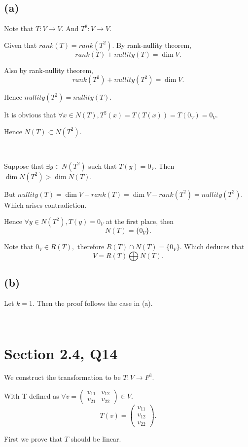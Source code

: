 \documentclass[12pt]{article}%
\begin{document}
\subsection{(a)}

Note that $T:V \to V.$ And $T^2:V \to V.$

Given that $rank(T)=rank(T^2).$ By rank-nullity theorem, $$rank(T)+nullity(T)=\dim{V}.$$

Also by rank-nullity theorem, $$rank(T^2)+nullity(T^2)=\dim{V}.$$

Hence $nullity(T^2)=nullity(T).$

It is obvious that $\forall x\in N(T),T^2(x)=T(T(x))=T(0_V)=0_V.$

Hence $N(T) \subset N(T^2).$

~\ 

Suppose that $\exists y \in N(T^2)$ such that $T(y)=0_V.$ Then $\dim{N(T^2)}>\dim{N(T)}.$

But $nullity(T)=\dim{V}-rank(T)=\dim{V}-rank(T^2)=nullity(T^2).$ Which arises contradiction.

Hence $\forall y \in N(T^2), T(y)=0_V$ at the first place, then $$N(T)=\{0_V\}.$$

Note that $0_V \in R(T),$ therefore $R(T) \cap N(T)=\{0_V\}.$ Which deduces that $$V=R(T)\bigoplus
N(T).$$

\subsection{(b)}

Let $k=1.$ Then the proof follows the case in (a).

~\ 

\section{Section 2.4, Q14}

We construct the transformation to be $T:V \to F^3.$

With T defined as $\forall v= \begin{pmatrix}v_{11}&v_{12}\\v_{21}&v_{22}\end{pmatrix}\in V.$ $$T(v)=\begin{pmatrix}v_{11}\\v_{12}\\v_{22}\end{pmatrix}.$$

First we prove that $T$ should be linear. 
\end{document}
